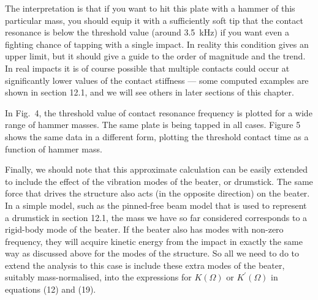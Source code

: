   The interpretation is that if you want to hit this plate with a hammer of 
  this particular mass, you should equip it with a sufficiently soft tip that 
  the contact resonance is below the threshold value (around 3.5~kHz) if you 
  want even a fighting chance of tapping with a single impact. In reality this 
  condition gives an upper limit, but it should give a guide to the order of 
  magnitude and the trend. In real impacts it is of course possible that 
  multiple contacts could occur at significantly lower values of the contact 
  stiffness --- some computed examples are shown in section 12.1, and we will 
  see others in later sections of this chapter. 

  In Fig.\ 4, the threshold value of contact resonance frequency is plotted for 
  a wide range of hammer masses. The same plate is being tapped in all cases. 
  Figure 5 shows the same data in a different form, plotting the threshold 
  contact time as a function of hammer mass. 

  Finally, we should note that this approximate calculation can be easily 
  extended to include the effect of the vibration modes of the beater, or 
  drumstick. The same force that drives the structure also acts (in the 
  opposite direction) on the beater. In a simple model, such as the pinned-free 
  beam model that is used to represent a drumstick in section 12.1, the mass we 
  have so far considered corresponds to a rigid-body mode of the beater. If the 
  beater also has modes with non-zero frequency, they will acquire kinetic 
  energy from the impact in exactly the same way as discussed above for the 
  modes of the structure. So all we need to do to extend the analysis to this 
  case is include these extra modes of the beater, suitably mass-normalised, 
  into the expressions for $K(\Omega)$ or $K^\prime (\Omega)$ in equations (12) 
  and (19). 